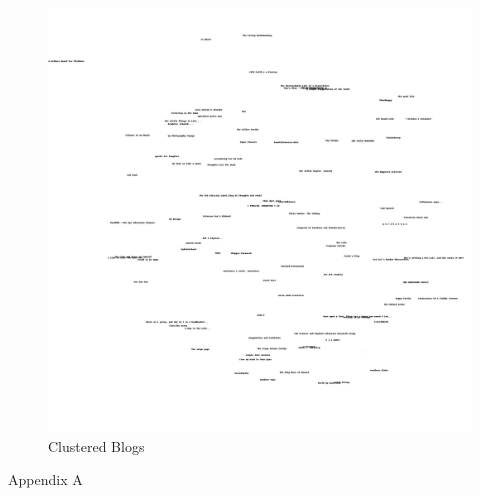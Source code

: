 \documentclass{article}
\begin{document}
\graphicspath{{q1/}}
\begin{figure}[H]
  \centering
  \caption{Clustered Blogs}
  \includegraphics[scale=.2]{blogs2d.jpg}
\end{figure}
\clearpage

\appendix
\newpage
Appendix A

\end{document}
